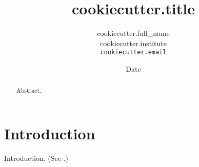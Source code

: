 \documentclass[conference]{article}
\author{
    {{ cookiecutter.full_name }}\\
    {{ cookiecutter.institute }}\\
    \texttt{{{ cookiecutter.email }}}
}
\date{Date}
\title{{{ cookiecutter.title }}}
\begin{document}
\maketitle

\begin{abstract}
    Abstract.
\end{abstract}

\section{Introduction}

Introduction. (See \cite{whitehead1912principia}.)


\balance

\end{document}
